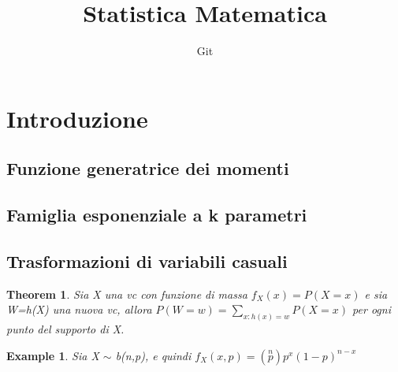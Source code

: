 \documentclass[12pt]{article}
\title{Statistica Matematica}
\author{Git}
\date{}
\newtheorem{example}{Example}
\newtheorem{theorem}{Theorem}
\begin{document}
\maketitle


\section{Introduzione}
\subsection{Funzione generatrice dei momenti}
\subsection{Famiglia esponenziale a k parametri}
\subsection{Trasformazioni di variabili casuali}

\begin{theorem}
Sia X una vc con funzione di massa $f_X(x)=P(X=x)$ e sia W=h(X) una nuova vc, allora $P(W=w)=\sum_{{x:h(x)=w}}P(X=x)$ per ogni punto del supporto di X.
\end{theorem}
\begin{example}
Sia X $\sim$ b(n,p), e quindi $f_X(x,p)=\left(\stackrel{n}{p}\right)p^x(1-p)^{n-x}$
\end{example}
\end{document}

